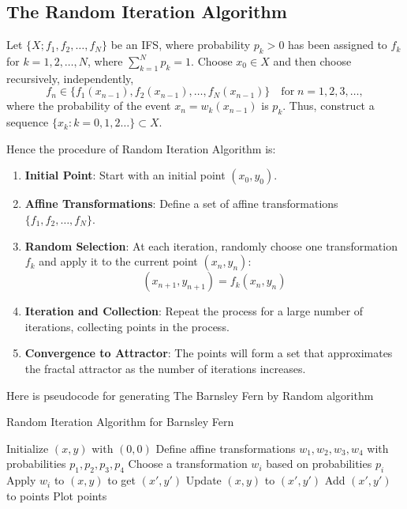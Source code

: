 \documentclass[a4paper,11pt, titlepage]{article}
\theoremstyle{definition}
\theoremstyle{plain}
\theoremstyle{remark}
\theoremstyle{definition}
\begin{document}
\subsection{The Random Iteration Algorithm}

Let $\{X; f_1, f_2, \ldots, f_N\}$ be an IFS, where probability $p_k > 0$ has been assigned to $f_k$ for $k = 1, 2, \ldots, N$, where $\sum_{k=1}^N p_k = 1$. Choose $x_0 \in X$ and then choose recursively, independently,
\[
f_n \in \{f_1(x_{n-1}), f_2(x_{n-1}), \ldots, f_N(x_{n-1})\} \quad \text{for} \; n = 1, 2, 3, \ldots,
\]
where the probability of the event $x_n = w_k(x_{n-1})$ is $p_k$. Thus, construct a sequence $\{x_k : k = 0, 1, 2 \ldots\} \subset X$.

Hence the procedure of Random Iteration Algorithm is:

\begin{enumerate}
    \item \textbf{Initial Point}: Start with an initial point \( (x_0, y_0) \).
    \item \textbf{Affine Transformations}: Define a set of affine transformations \( \{f_1, f_2, \ldots, f_N\} \).
    \item \textbf{Random Selection}: At each iteration, randomly choose one transformation \( f_k \) and apply it to the current point \( (x_n, y_n) \):
    \[
    (x_{n+1}, y_{n+1}) = f_k(x_n, y_n)
    \]
    \item \textbf{Iteration and Collection}: Repeat the process for a large number of iterations, collecting points in the process.
    \item \textbf{Convergence to Attractor}: The points will form a set that approximates the fractal attractor as the number of iterations increases.
\end{enumerate}

Here is pseudocode for generating The Barnsley Fern by Random algorithm

\begin{algorithm}
\caption{Random Iteration Algorithm for Barnsley Fern}
\begin{algorithmic}[1]
    \STATE Initialize \((x, y)\) with \((0, 0)\)\;
    \STATE Define affine transformations \(w_1, w_2, w_3, w_4\) with probabilities \(p_1, p_2, p_3, p_4\)\;
        \STATE Choose a transformation \(w_i\) based on probabilities \(p_i\)\;
        \STATE Apply \(w_i\) to \((x, y)\) to get \((x', y')\)\;
        \STATE Update \((x, y)\) to \((x', y')\)\; Add \((x', y')\) to points\;
    \ENDFOR
    \STATE Plot points
\end{algorithmic}
\end{algorithm}
\end{document}

